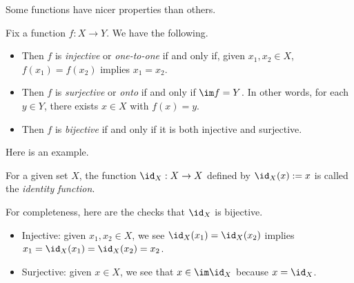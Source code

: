 Some functions have nicer properties than others.
\begin{definition}
	Fix a function $f:X\to Y$. We have the following.
	\begin{itemize}
		\item Then $f$ is \textit{injective} or \textit{one-to-one} if and only if, given $x_1,x_2\in X$, $f(x_1)=f(x_2)$ implies $x_1=x_2$.
		\item Then $f$ is \textit{surjective} or \textit{onto} if and only if $\im f=Y$. In other words, for each $y\in Y$, there exists $x\in X$ with $f(x)=y$.
		\item Then $f$ is \textit{bijective} if and only if it is both injective and surjective.
	\end{itemize}
\end{definition}
Here is an example.
\begin{definition}[Identity]
	For a given set $X$, the function $\id_X:X\to X$ defined by $\id_X(x):=x$ is called the \textit{identity function}.
\end{definition}
For completeness, here are the checks that $\id_X$ is bijective.
\begin{itemize}
	\item Injective: given $x_1,x_2\in X$, we see $\id_X(x_1)=\id_X(x_2)$ implies $x_1=\id_X(x_1)=\id_X(x_2)=x_2$.
	\item Surjective: given $x\in X$, we see that $x\in\im\id_X$ because $x=\id_X$.
\end{itemize}

